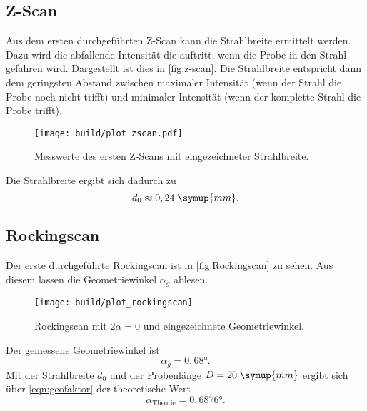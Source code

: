 \subsection{Z-Scan}
Aus dem ersten durchgeführten Z-Scan kann die Strahlbreite ermittelt werden. Dazu wird die 
abfallende Intensität die auftritt, wenn die Probe in den Strahl gefahren wird. Dargestellt ist dies 
in \autoref{fig:z-scan}. Die Strahlbreite entspricht dann dem geringsten Abstand zwischen
maximaler Intensität (wenn der Strahl die Probe noch nicht trifft) und minimaler Intensität
(wenn der komplette Strahl die Probe trifft).
\begin{figure}
    \centering
    \texttt{[image: build/plot\_zscan.pdf]}
    \caption{Messwerte des ersten Z-Scans mit eingezeichneter Strahlbreite.}
    \label{fig:z-scan}
\end{figure}
Die Strahlbreite ergibt sich dadurch zu 
\begin{equation*}
    d_0 \approx 0,24\; \symup{mm}.
\end{equation*} 

\subsection{Rockingscan}
Der erste durchgeführte Rockingscan ist in \autoref{fig:Rockingscan} zu sehen. Aus diesem lassen
die Geometriewinkel $\alpha_g$ ablesen. 
\begin{figure}
    \centering 
    \texttt{[image: build/plot\_rockingscan]}
    \caption{Rockingscan mit $2 \alpha = 0$ und eingezeichnete Geometriewinkel.}
    \label{fig:Rockingscan}
\end{figure}
Der gemessene Geometriewinkel ist 
\begin{equation*}
    \alpha_g = 0,68°.
\end{equation*}
Mit der Strahlbreite $d_0$ und der Probenlänge $D = 20\;\symup{mm}$ ergibt sich über 
\autoref{eqn:geofaktor} der theoretische Wert
\begin{equation*}
    \alpha_{\text{Theorie}} = 0,6876°.
\end{equation*}

